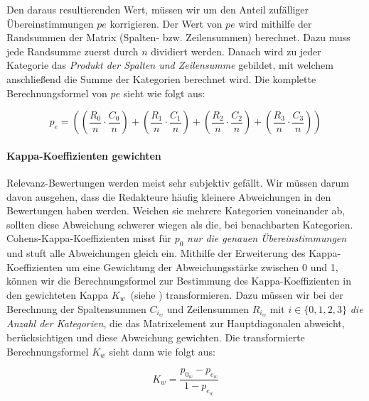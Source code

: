 Den daraus resultierenden Wert, müssen wir um den Anteil zufälliger Übereinstimmungen $pe$ korrigieren. Der Wert von $pe$ wird mithilfe der Randsummen der Matrix (Spalten- bzw. Zeilensummen) berechnet. Dazu muss jede Randsumme zuerst durch $n$ dividiert werden. Danach wird zu jeder Kategorie das \textit{Produkt der Spalten und Zeilensumme} gebildet, mit welchem anschließend die Summe der Kategorien berechnet wird. Die komplette Berechnungsformel von $pe$ sieht wie folgt aus:

\vspace{-1em}
\begin{equation}	
	p_e = \left(  \left(\frac{  R_{0} }{ n } \cdot \frac{ C_{0} }{ n } \right) +   \left(\frac{  R_1 }{ n } \cdot \frac{ C_1  }{ n } \right) +   \left(\frac{  R_2 }{ n } \cdot \frac{ C_2 }{ n } \right)  +  \left(\frac{ R_3 }{ n } \cdot \frac{   C_3 }{ n }\right) \right)
\end{equation}
\vspace{-1em}

\paragraph{Kappa-Koeffizienten gewichten}
Relevanz-Bewertungen werden meist sehr subjektiv gefällt. Wir müssen darum davon ausgehen, dass die Redakteure häufig kleinere Abweichungen in den Bewertungen haben werden. Weichen sie mehrere Kategorien voneinander ab, sollten diese Abweichung schwerer wiegen als die, bei benachbarten Kategorien. Cohens-Kappa-Koeffizienten misst für $p_0$ \textit{nur die genauen Übereinstimmungen} und stuft alle Abweichungen gleich ein. Mithilfe der Erweiterung des Kappa-Koeffizienten um eine Gewichtung der Abweichungsstärke zwischen 0 und 1, können wir die Berechnungsformel zur Bestimmung des Kappa-Koeffizienten in den gewichteten Kappa $K_w$~(siehe \cite{KappaWerte}) transformieren. Dazu müssen wir bei der Berechnung der Spaltensummen $C_{i_{w}}$ und Zeilensummen $R_{i_{w}}$ mit $i \in \lbrace 0, 1, 2, 3 \rbrace$ \textit{die Anzahl der Kategorien}, die das Matrixelement zur Hauptdiagonalen abweicht, berücksichtigen und diese Abweichung gewichten. Die transformierte Berechnungsformel $K_w$ sieht dann wie folgt aus:

\vspace{-1.5em}
\begin{equation}	
	K_w = \frac{p_{0_{w}} - p_{e_{w}}}{1 - p_{e_{w}}}
\end{equation}
\vspace{-1.5em}

